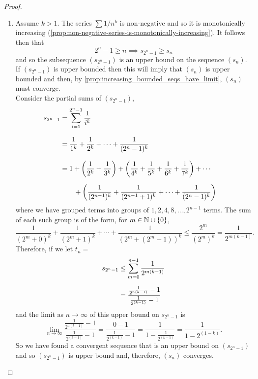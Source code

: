 \documentclass[../MathsNotesBase.tex]{subfiles}
\begin{document}
{\begin{proof}
\begin{enumerate}[label=(\roman*)]
				\bigskip
				\item Assume ${ k > 1 }$. The series ${ \sum 1/n^k }$ is non-negative and so it is monotonically increasing (\autoref{prop:non-negative-series-is-monotonically-increasing}). It follows then that
				 \[ 2^n - 1 \geq n \implies s_{2^n - 1} \geq s_n \]
				 and so the subsequence $(s_{2^n - 1})$ is an upper bound on the sequence $(s_n)$. If $(s_{2^n - 1})$ is upper bounded then this will imply that $(s_n)$ is upper bounded and then, by \autoref{prop:increasing_bounded_seqs_have_limit}, $(s_n)$ must converge.\\
				 
				 Consider the partial sums of $(s_{2^n - 1})$,
				 \[\begin{aligned}
				 	s_{2^n - 1} &= \sum_{i=1}^{2^n - 1} \frac{1}{i^k} \nnn
				 	&= \frac{1}{1^k} + \frac{1}{2^k} + \cdots + \frac{1}{(2^n - 1)^k} &\sidecomment{} \nnn
				 	&= 1 + \left(\frac{1}{2^k} + \frac{1}{3^k}\right) + \left(\frac{1}{4^k} + \frac{1}{5^k} + \frac{1}{6^k} + \frac{1}{7^k}\right) + \cdots \nn
				 	&\hspace{20pt} + \left(\frac{1}{(2^{n-1})^k} + \frac{1}{(2^{n-1} + 1)^k} + \cdots + \frac{1}{(2^n - 1)^k}\right) &\sidecomment{} \\
				 \end{aligned}\]
			 	 where we have grouped terms into groups of $1, 2, 4, 8, \dots, 2^{n-1}$ terms. The sum of each such group is of the form, for ${ m \in \mathbb{N}^{} \cup \{0\} }$,
			 	 \[ \frac{1}{(2^m + 0)^k} + \frac{1}{(2^m + 1)^k} + \cdots + \frac{1}{(2^m + (2^m - 1))^k} \leq \frac{2^m}{(2^m)^k} = \frac{1}{2^{m(k-1)}}. \]
			 	 Therefore, if we let ${ t_n =  }$
			 	 \[\begin{aligned}
			 	 	s_{2^n - 1} &\leq \sum_{m=0}^{n-1} \frac{1}{2^{m(k-1)}} \nn
			 	 	&= \frac{\frac{1}{2^{n(k-1)}} - 1}{\frac{1}{2^{(k-1)}} - 1}
			 	 \end{aligned}\]
		 	 	\nl
		 	 	and the limit as ${ n \to \infty }$ of this upper bound on $s_{2^n - 1}$ is
		 	 	\[ \lim_{n \to \infty} \frac{\frac{1}{2^{n(k-1)}} - 1}{\frac{1}{2^{(k-1)}} - 1} = \frac{0 - 1}{\frac{1}{2^{(k-1)}} - 1} = \frac{1}{1 - \frac{1}{2^{(k-1)}}} = \frac{1}{1 - 2^{(1-k)}}. \]
		 	 	So we have found a convergent sequence that is an upper bound on $(s_{2^n - 1})$ and so $(s_{2^n - 1})$ is upper bound and, therefore, $(s_n)$ converges.
			\end{enumerate}
		\end{proof}
	
}
\end{document}
